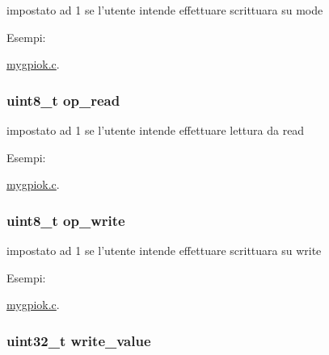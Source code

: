 impostato ad 1 se l'utente intende effettuare scrittuara su mode 

\begin{Desc}
\item[Esempi\+: ]\par
\hyperlink{mygpiok_8c-example}{mygpiok.\+c}.\end{Desc}
\hypertarget{structparam__t_ae66d5c3154a115636a63227b7489a6eb}{
\subsubsection[{op\+\_\+read}]{\setlength{\rightskip}{0pt plus 5cm}uint8\+\_\+t op\+\_\+read}}\label{structparam__t_ae66d5c3154a115636a63227b7489a6eb}


impostato ad 1 se l'utente intende effettuare lettura da read 

\begin{Desc}
\item[Esempi\+: ]\par
\hyperlink{mygpiok_8c-example}{mygpiok.\+c}.\end{Desc}
\hypertarget{structparam__t_a67752de733f167918a4e966354183a69}{
\subsubsection[{op\+\_\+write}]{\setlength{\rightskip}{0pt plus 5cm}uint8\+\_\+t op\+\_\+write}}\label{structparam__t_a67752de733f167918a4e966354183a69}


impostato ad 1 se l'utente intende effettuare scrittuara su write 

\begin{Desc}
\item[Esempi\+: ]\par
\hyperlink{mygpiok_8c-example}{mygpiok.\+c}.\end{Desc}
\hypertarget{structparam__t_a09e0cff25312ab7f748a3063c038a2d9}{
\subsubsection[{write\+\_\+value}]{\setlength{\rightskip}{0pt plus 5cm}uint32\+\_\+t write\+\_\+value}}\label{structparam__t_a09e0cff25312ab7f748a3063c038a2d9}


